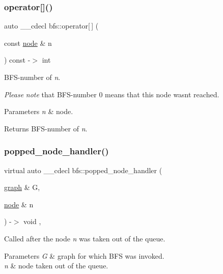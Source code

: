 \subsubsection{\texorpdfstring{operator[]()}{operator[]()}}
{\footnotesize\ttfamily auto \+\_\+\+\_\+cdecl bfs\+::operator\mbox{[}$\,$\mbox{]} (\begin{DoxyParamCaption}\item[{const \mbox{\hyperlink{classnode}{node}} \&}]{n }\end{DoxyParamCaption}) const -\/$>$ int
	\hspace{0.3cm}{\ttfamily [inline]}}



B\+F\+S-\/number of {\itshape n}. 

{\itshape Please} {\itshape note} that B\+F\+S-\/number 0 means that this node wasn\textquotesingle{}t reached.


\begin{DoxyParams}{Parameters}
{\em n} & node. \\
\hline
\end{DoxyParams}
\begin{DoxyReturn}{Returns}
B\+F\+S-\/number of {\itshape n}. 
\end{DoxyReturn}
\mbox{\label{classbfs_a4ae61f9bbdfddf3f3a8b083e1aed9eeb}} 
\subsubsection{\texorpdfstring{popped\+\_\+node\+\_\+handler()}{popped\_node\_handler()}}
{\footnotesize\ttfamily virtual auto \+\_\+\+\_\+cdecl bfs\+::popped\+\_\+node\+\_\+handler (\begin{DoxyParamCaption}\item[{\mbox{\hyperlink{classgraph}{graph}} \&}]{G,  }\item[{\mbox{\hyperlink{classnode}{node}} \&}]{n }\end{DoxyParamCaption}) -\/$>$ void \hspace{0.3cm}{\ttfamily [inline]}, {\ttfamily [virtual]}}



Called after the node {\itshape n} was taken out of the queue. 


\begin{DoxyParams}{Parameters}
{\em G} & graph for which B\+FS was invoked. \\
\hline
{\em n} & node taken out of the queue. \\
\hline
\end{DoxyParams}
\mbox{\label{classbfs_a589d9acf6d6aeeac5f586a5fdac6528e}} 
